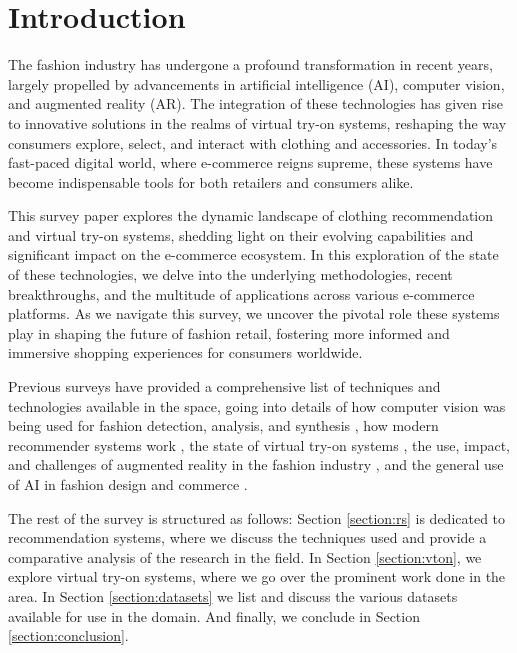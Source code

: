 \section{Introduction} \label{section:intro}
	The fashion industry has undergone a profound transformation in recent years, largely propelled by advancements in artificial intelligence (AI), computer vision, and augmented reality (AR). The integration of these technologies has given rise to innovative solutions in the realms of virtual try-on systems, reshaping the way consumers explore, select, and interact with clothing and accessories. In today's fast-paced digital world, where e-commerce reigns supreme, these systems have become indispensable tools for both retailers and consumers alike.

	This survey paper explores the dynamic landscape of clothing recommendation and virtual try-on systems, shedding light on their evolving capabilities and significant impact on the e-commerce ecosystem. In this exploration of the state of these technologies, we delve into the underlying methodologies, recent breakthroughs, and the multitude of applications across various e-commerce platforms. As we navigate this survey, we uncover the pivotal role these systems play in shaping the future of fashion retail, fostering more informed and immersive shopping experiences for consumers worldwide.

	Previous surveys have provided a comprehensive list of techniques and technologies available in the space, going into details of how computer vision was being used for fashion detection, analysis, and synthesis \cite{DBLP:journals/csur/ChengSCHL21, Jain_Wah_2022}, how modern recommender systems work \cite{DBLP:journals/corr/abs-2202-02757, DBLP:journals/sncs/ShirkhaniMSH23}, the state of virtual try-on systems \cite{DBLP:journals/corr/abs-2111-00905, DBLP:journals/mta/GhodhbaniNRA22, DBLP:journals/cvm/LiangL21}, the use, impact, and challenges of augmented reality in the fashion industry \cite{menon2020impact, jayamini2021use, DBLP:journals/corr/abs-2202-09450, huang2019enhancing, mehta2020enhancement, zak2020augmented, caboni2019augmented}, and the general use of AI in fashion design and commerce \cite{DBLP:journals/access/GiriJZB19, DBLP:journals/corr/abs-2105-03050, DBLP:journals/access/GuoZLCCW23, DBLP:journals/spm/ChenSC23, sahni2021review, liang2020implementation, sareen2022ai, 10153335, DBLP:journals/tmm/Yan0LZX0Y23}.

	The rest of the survey is structured as follows: Section \ref{section:rs} is dedicated to recommendation systems, where we discuss the techniques used and provide a comparative analysis of the research in the field. In Section \ref{section:vton}, we explore virtual try-on systems, where we go over the prominent work done in the area. In Section \ref{section:datasets} we list and discuss the various datasets available for use in the domain. And finally, we conclude in Section \ref{section:conclusion}.